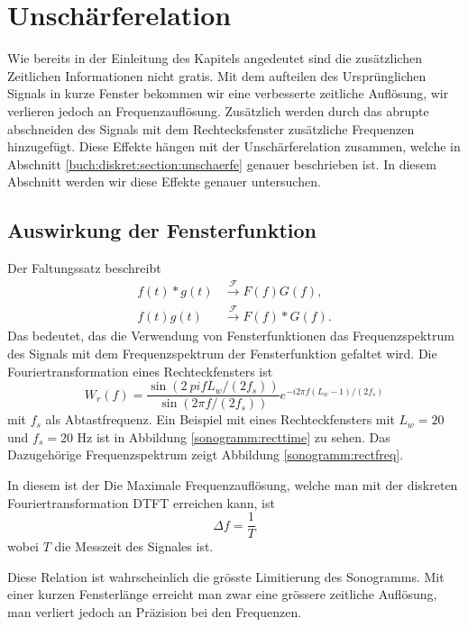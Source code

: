 %
%
%
%
\section{Unschärferelation
\label{sonogramm:section:teil1}}
Wie bereits in der Einleitung des Kapitels angedeutet sind die zusätzlichen
Zeitlichen Informationen nicht gratis. 
Mit dem aufteilen des Ursprünglichen Signals in kurze Fenster bekommen wir eine
verbesserte zeitliche Auflösung, wir verlieren jedoch an Frequenzauflösung.
Zusätzlich werden durch das abrupte abschneiden des Signals mit dem Rechtecksfenster
zusätzliche Frequenzen hinzugefügt. 
Diese Effekte hängen mit der Unschärferelation zusammen, welche in Abschnitt
\ref{buch:diskret:section:unschaerfe} genauer beschrieben ist.
In diesem Abschnitt werden wir diese Effekte genauer untersuchen.
\subsection{Auswirkung der Fensterfunktion}
Der Faltungssatz beschreibt 
\begin{align}
    f(t) * g(t)& \xrightarrow{\mathscr{F}} F(f)G(f),\\
    f(t) g(t)&\xrightarrow{\mathscr{F}}F(f) * G(f).
\end{align}
Das bedeutet, das die Verwendung von Fensterfunktionen das Frequenzspektrum
des Signals mit dem Frequenzspektrum der Fensterfunktion gefaltet wird.
Die Fouriertransformation eines Rechteckfensters ist 
\begin{equation}
    W_r(f) = \frac{\sin(2 \ pi f  L_w / (2 f_s))}{\sin(2 \pi f / (2 f_s))} e^{-i 2 \pi f (L_w-1)/(2f_s)}
\end{equation}
mit $f_s$ als Abtastfrequenz.
Ein Beispiel mit eines Rechteckfensters mit $L_w = 20$ und $f_s = 20$ Hz ist in Abbildung \ref{sonogramm:recttime}
zu sehen.
Das Dazugehörige Frequenzspektrum zeigt Abbildung \ref{sonogramm:rectfreq}. 

In diesem ist der 
Die Maximale Frequenzauflösung, welche man mit der diskreten Fouriertransformation DTFT erreichen
kann, ist 
\begin{equation}
    \Delta f = \frac{1}{T}
\end{equation}
wobei $T$ die Messzeit des Signales ist.

Diese Relation ist wahrscheinlich die grösste Limitierung des Sonogramms.
Mit einer kurzen Fensterlänge erreicht man zwar eine grössere zeitliche Auflösung,
man verliert jedoch an Präzision bei den Frequenzen.

